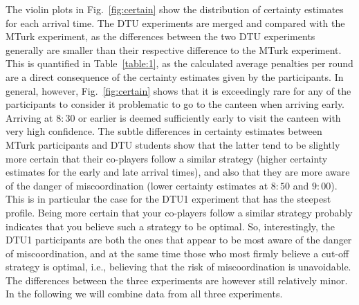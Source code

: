 \documentclass[twocolumn,a4paper,superscriptaddress,nofootinbib]{revtex4}
\newcommand{\tobo}[1]{{\color{red} TOBO: #1}}
\newcommand{\tsn}[1]{{\color{blue} TSN: #1}}
\newcommand{\re}[1]{{\color{brown} RE: #1}}
\begin{document}
The violin plots in Fig.~\ref{fig:certain} show the distribution of certainty estimates for each arrival time. The DTU experiments are merged and compared with the MTurk experiment, as the differences between the two DTU experiments generally are smaller than their respective difference to the MTurk experiment. This is quantified in Table~\ref{table:1}, as the calculated average penalties per round are a direct consequence of the certainty estimates given by the participants. In general, however, Fig.~\ref{fig:certain} shows that it is exceedingly rare for any of the participants to consider it problematic to go to the canteen when arriving early. Arriving at $8{:}30$ or earlier is deemed sufficiently early to visit the canteen with very high confidence. %
The subtle differences in certainty estimates between MTurk participants and DTU students show that the latter tend to be slightly more certain that their co-players follow a similar strategy (higher certainty estimates for the early and late arrival times), and also that they are more aware of the danger of miscoordination (lower certainty estimates at $8{:}50$ and $9{:}00$). This is in particular the case for the DTU1 experiment that has the steepest profile. Being more certain that your co-players follow a similar strategy probably indicates that you believe such a strategy to be optimal. So, interestingly, the DTU1 participants are both the ones that appear to be most aware of the danger of miscoordination, and at the same time those who most firmly believe a cut-off strategy is optimal, i.e., believing that the risk of miscoordination is unavoidable. The differences between the three experiments are however still relatively minor. In the following we will combine data from all three experiments.
\end{document}
